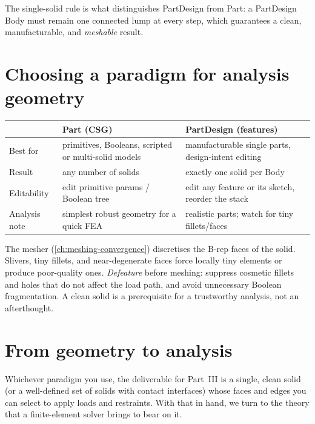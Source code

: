 The single-solid rule is what distinguishes PartDesign from Part: a
PartDesign Body must remain one connected lump at every step, which
guarantees a clean, manufacturable, and \emph{meshable} result.

\section{Choosing a paradigm for analysis geometry}

\begin{center}
\begin{tabularx}{\linewidth}{lXX}
  \toprule
   & \textsf{Part} (CSG) & \textsf{PartDesign} (features) \\
  \midrule
  Best for      & primitives, Booleans, scripted or multi-solid models
                & manufacturable single parts, design-intent editing \\
  Result        & any number of solids & exactly one solid per Body \\
  Editability   & edit primitive params / Boolean tree
                & edit any feature or its sketch, reorder the stack \\
  Analysis note & simplest robust geometry for a quick FEA
                & realistic parts; watch for tiny fillets/faces \\
  \bottomrule
\end{tabularx}
\end{center}

\begin{fcwarn}
The mesher (\cref{ch:meshing-convergence}) discretises the B-rep faces of
the solid. Slivers, tiny fillets, and near-degenerate faces force
locally tiny elements or produce poor-quality ones. \emph{Defeature}
before meshing: suppress cosmetic fillets and holes that do not affect
the load path, and avoid unnecessary Boolean fragmentation. A clean
solid is a prerequisite for a trustworthy analysis, not an afterthought.
\end{fcwarn}

\section{From geometry to analysis}

Whichever paradigm you use, the deliverable for Part~III is a single,
clean solid (or a well-defined set of solids with contact interfaces)
whose faces and edges you can select to apply loads and restraints. With
that in hand, we turn to the theory that a finite-element solver brings
to bear on it.

